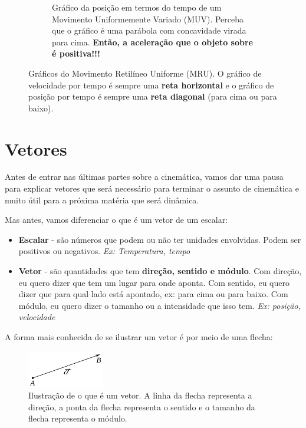 \documentclass[12pt]{extarticle}
\newcommand{\<}{\langle}
\renewcommand{\>}{\rangle}
\theoremstyle{definition}
\begin{document}
\begin{itemize}
\begin{figure}[H]
\begin{subfigure}[b]{0.4\textwidth}
         \caption{Gráfico da posição em termos do tempo de um Movimento Uniformemente Variado (MUV). Perceba que o gráfico é uma parábola com concavidade virada para cima. \textbf{Então, a aceleração que o objeto sobre é positiva!!!}}
         \label{fig:MUV_pos_a>0}
     \end{subfigure}
     \caption{Gráficos do Movimento Retilíneo Uniforme (MRU). O gráfico de velocidade por tempo é sempre uma \textbf{reta horizontal} e o gráfico de posição por tempo é sempre uma \textbf{reta diagonal} (para cima ou para baixo).}
     \label{fig:MRU_plots}
\end{figure}
\end{itemize}

\section{Vetores}

Antes de entrar nas últimas partes sobre a cinemática, vamos dar uma pausa para explicar vetores que será necessário para terminar o assunto de cinemática e muito útil para a próxima matéria que será dinâmica.

Mas antes, vamos diferenciar o que é um vetor de um escalar:
\begin{itemize}
    \item \textbf{Escalar} - são números que podem ou não ter unidades envolvidas. Podem ser positivos ou negativos. \textit{Ex: Temperatura, tempo}
    \item \textbf{Vetor} - são quantidades que tem \textbf{direção, sentido e módulo}. Com direção, eu quero dizer que tem um lugar para onde aponta. Com sentido, eu quero dizer que para qual lado está apontado, ex: para cima ou para baixo. Com módulo, eu quero dizer o tamanho ou a intensidade que isso tem. \textit{Ex: posição, velocidade}
\end{itemize}

A forma mais conhecida de se ilustrar um vetor é por meio de uma flecha:
\begin{figure}[H]
    \centering
    \includegraphics[width=0.3\textwidth]{440px-VectorAB.svg.png}
    \caption{Ilustração de o que é um vetor. A linha da flecha representa a direção, a ponta da flecha representa o sentido e o tamanho da flecha representa o módulo.}
    \label{fig:vector}
\end{figure}
\end{document}
